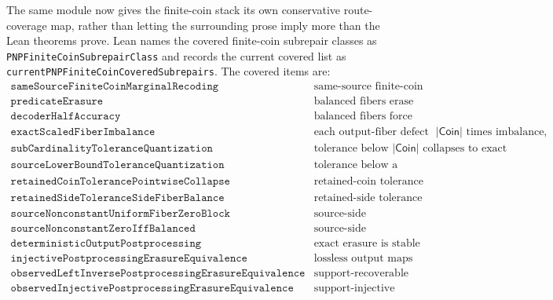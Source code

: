 \documentclass[11pt]{article}
\theoremstyle{remark}
\begin{document}
The same module now gives the finite-coin stack its own conservative
route-coverage map, rather than letting the surrounding prose imply more than
the Lean theorems prove.  Lean names the covered finite-coin subrepair classes
as \texttt{PNPFiniteCoinSubrepairClass} and records the current covered list as
\texttt{currentPNPFiniteCoinCoveredSubrepairs}.  The covered items are:
\[
\begin{array}{ll}
\texttt{sameSourceFiniteCoinMarginalRecoding}
  & \text{same-source finite-coin marginal recodings of the source bit,}\\
\texttt{predicateErasure}
  & \text{balanced fibers erase every decidable output predicate,}\\
\texttt{decoderHalfAccuracy}
  & \text{balanced fibers force every Boolean decoder to be half-accurate,}\\
\texttt{exactScaledFiberImbalance}
  & \text{each output-fiber defect is }|\mathsf{Coin}|\text{ times imbalance,}\\
\texttt{subCardinalityToleranceQuantization}
  & \text{tolerance below }|\mathsf{Coin}|\text{ collapses to exact balance,}\\
\texttt{sourceLowerBoundToleranceQuantization}
  & \text{tolerance below a source/coin block collapses to balance,}\\
\texttt{retainedCoinTolerancePointwiseCollapse}
  & \text{retained-coin tolerance below a source/coin block collapses pointwise,}\\
\texttt{retainedSideToleranceSideFiberBalance}
  & \text{retained-side tolerance below a source/coin block collapses fiberwise,}\\
\texttt{sourceNonconstantUniformFiberZeroBlock}
  & \text{source-side nondegeneracy blocks uniform zero-tolerance fibers,}\\
\texttt{sourceNonconstantZeroIffBalanced}
  & \text{source-side nondegenerate zero tolerance iff balanced fibers,}\\
\texttt{deterministicOutputPostprocessing}
  & \text{exact erasure is stable under deterministic output maps,}\\
\texttt{injectivePostprocessingErasureEquivalence}
  & \text{lossless output maps cannot create finite-coin erasure,}\\
\texttt{observedLeftInversePostprocessingErasureEquivalence}
  & \text{support-recoverable postprocessing cannot create erasure,}\\
\texttt{observedInjectivePostprocessingErasureEquivalence}
  & \text{support-injective postprocessing cannot create erasure,}\\

\end{array}\]
\end{document}
